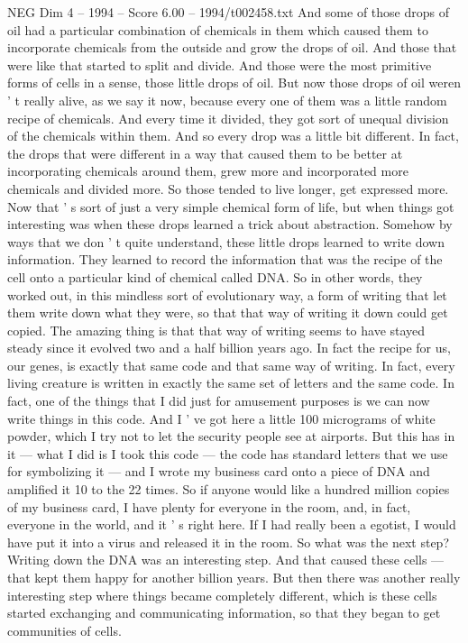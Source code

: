\begin{textsample}{NEG Dim 4 – 1994 – Score 6.00 – 1994/t002458.txt}
And some of those drops of oil had a particular combination of chemicals in them which caused them to incorporate chemicals from the outside and grow the drops of oil.
And those that were like that started to split and divide.
And those were the most primitive forms of cells in a sense, those little drops of oil.
But now those drops of oil weren ' t really alive, as we say it now, because every one of them was a little random recipe of chemicals.
And every time it divided, they got sort of unequal division of the chemicals within them.
And so every drop was a little bit different.
In fact, the drops that were different in a way that caused them to be better at incorporating chemicals around them, grew more and incorporated more chemicals and divided more.
So those tended to live longer, get expressed more.
Now that ' s sort of just a very simple chemical form of life, but when things got interesting was when these drops learned a trick about abstraction.
Somehow by ways that we don ' t quite understand, these little drops learned to write down information.
They learned to record the information that was the recipe of the cell onto a particular kind of chemical called DNA.
So in other words, they worked out, in this mindless sort of evolutionary way, a form of writing that let them write down what they were, so that that way of writing it down could get copied.
The amazing thing is that that way of writing seems to have stayed steady since it evolved two and a half billion years ago.
In fact the recipe for us, our genes, is exactly that same code and that same way of writing.
In fact, every living creature is written in exactly the same set of letters and the same code.
In fact, one of the things that I did just for amusement purposes is we can now write things in this code.
And I ' ve got here a little 100 micrograms of white powder, which I try not to let the security people see at airports.
But this has in it — what I did is I took this code — the code has standard letters that we use for symbolizing it — and I wrote my business card onto a piece of DNA and amplified it 10 to the 22 times.
So if anyone would like a hundred million copies of my business card, I have plenty for everyone in the room, and, in fact, everyone in the world, and it ' s right here.
If I had really been a egotist, I would have put it into a virus and released it in the room.
So what was the next step?
Writing down the DNA was an interesting step.
And that caused these cells — that kept them happy for another billion years.
But then there was another really interesting step where things became completely different, which is these cells started exchanging and communicating information, so that they began to get communities of cells.

\end{textsample}
